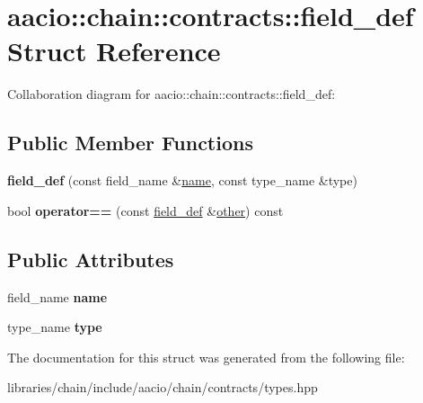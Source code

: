 \hypertarget{structaacio_1_1chain_1_1contracts_1_1field__def}{}\section{aacio\+:\+:chain\+:\+:contracts\+:\+:field\+\_\+def Struct Reference}
\label{structaacio_1_1chain_1_1contracts_1_1field__def}


Collaboration diagram for aacio\+:\+:chain\+:\+:contracts\+:\+:field\+\_\+def\+:
\subsection*{Public Member Functions}
\begin{DoxyCompactItemize}
\item 
\mbox{\label{structaacio_1_1chain_1_1contracts_1_1field__def_a18c8d949eb3ae052892770c8c0d048b3}} 
{\bfseries field\+\_\+def} (const field\+\_\+name \&\mbox{\hyperlink{structaacio_1_1chain_1_1name}{name}}, const type\+\_\+name \&type)
\item 
\mbox{\label{structaacio_1_1chain_1_1contracts_1_1field__def_a5a0a1546607e2a84da414213b91624ee}} 
bool {\bfseries operator==} (const \mbox{\hyperlink{structaacio_1_1chain_1_1contracts_1_1field__def}{field\+\_\+def}} \&\mbox{\hyperlink{structother}{other}}) const
\end{DoxyCompactItemize}
\subsection*{Public Attributes}
\begin{DoxyCompactItemize}
\item 
\mbox{\label{structaacio_1_1chain_1_1contracts_1_1field__def_ae50d39389ffa52f4edeff0cb6ffdb1ca}} 
field\+\_\+name {\bfseries name}
\item 
\mbox{\label{structaacio_1_1chain_1_1contracts_1_1field__def_ace7ef3289e1712a03e303e0521508cc6}} 
type\+\_\+name {\bfseries type}
\end{DoxyCompactItemize}


The documentation for this struct was generated from the following file\+:\begin{DoxyCompactItemize}
\item 
libraries/chain/include/aacio/chain/contracts/types.\+hpp\end{DoxyCompactItemize}
